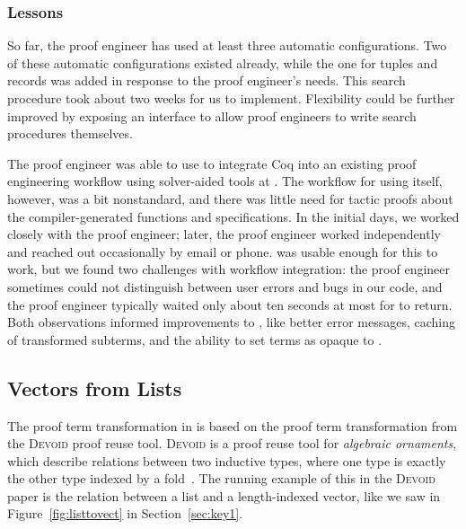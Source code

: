 \subsubsection{Lessons}

So far, the proof engineer has used at least three automatic configurations.
Two of these automatic configurations existed already, while the one for tuples and records was
added in response to the proof engineer's needs.
This search procedure took about two weeks for us to implement. %
Flexibility could be further improved by exposing an interface to allow proof engineers to
write search procedures themselves.

The proof engineer was able to use \toolname to integrate Coq into an existing proof engineering
workflow using solver-aided tools at \company.
The workflow for using \toolname itself, however, was a bit nonstandard,
and there was little need for tactic proofs about the compiler-generated functions and specifications.
In the initial days, we worked closely with the proof engineer;
later, the proof engineer worked independently and reached out occasionally by email or phone.
\toolname was usable enough for this to work, but we found two challenges with workflow integration:
the proof engineer sometimes could not distinguish between user errors and bugs in our code,
and the proof engineer typically waited only about ten seconds at most for \toolname to return.
Both observations informed improvements to \toolname, like better error messages, caching of transformed subterms,
and the ability to set terms as opaque to \toolname.

\subsection{Vectors from Lists}
\label{sec:dep}

The proof term transformation in \toolname is based on the proof term transformation from
the \textsc{Devoid} proof reuse tool.
\textsc{Devoid} is a proof reuse tool for \textit{algebraic ornaments}, which describe relations
between two inductive types, where one type is exactly the other type indexed by a fold~\cite{mcbride}.
The running example of this in the \textsc{Devoid} paper is the relation between a list and a
length-indexed vector, like we saw in Figure~\ref{fig:listtovect} in Section~\ref{sec:key1}.

